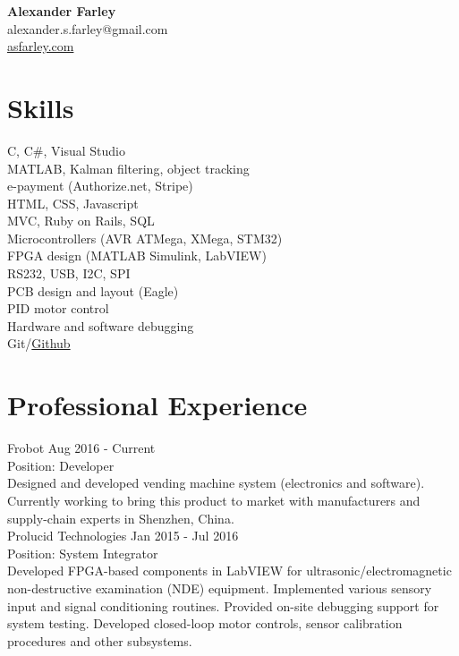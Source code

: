 \documentclass{article}
\begin{document}
\thispagestyle{empty}

\hspace*{1 in} \large \textbf{Alexander Farley} \normalsize \\
\hspace*{1 in} alexander.s.farley@gmail.com \\
\hspace*{1 in} \href{http://asfarley.com}{asfarley.com} 

\section*{\large Skills \normalsize}
\begin{multicols}{2}
C, C\#, Visual Studio \\
MATLAB, Kalman filtering, object tracking \\
e-payment (Authorize.net, Stripe) \\
HTML, CSS, Javascript \\
MVC, Ruby on Rails, SQL \\
Microcontrollers (AVR ATMega, XMega, STM32) \\
FPGA design (MATLAB Simulink, LabVIEW) \\
RS232, USB, I2C, SPI \\
PCB design and layout (Eagle)\\
PID motor control\\
Hardware and software debugging\\
Git/\href{https://github.com/asfarley}{Github}
\end{multicols}

\section*{\large Professional Experience \normalsize}

Frobot \hrulefill Aug 2016 - Current \\
\small Position: Developer \\
Designed and developed vending machine system (electronics and software). Currently working to bring this product to market with manufacturers and supply-chain experts in Shenzhen, China. \normalsize \\

Prolucid Technologies \hrulefill Jan 2015 - Jul 2016 \\
\small Position: System Integrator \\
Developed FPGA-based components in LabVIEW for ultrasonic/electromagnetic non-destructive examination (NDE) equipment. Implemented various sensory input and signal conditioning routines. Provided on-site debugging support for system testing.  Developed closed-loop motor controls, sensor calibration procedures and other subsystems. \\
\end{document}
